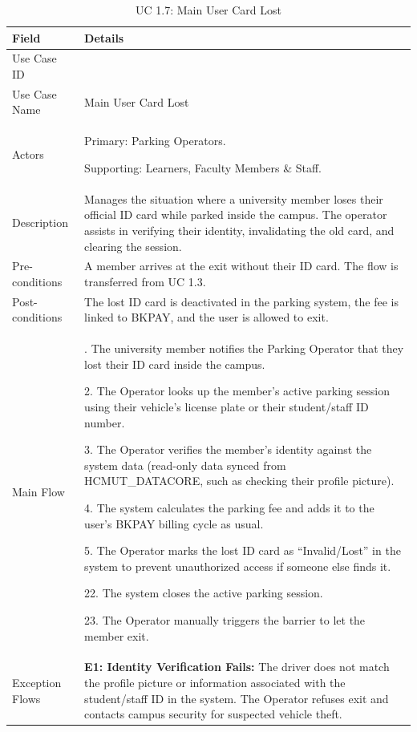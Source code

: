 \begin{table}[H]
\small
\renewcommand{\arraystretch}{1.4}
\begin{tabularx}{\textwidth}{|>{\raggedright\arraybackslash}p{3.5cm}|>{\RaggedRight\arraybackslash}X|}
\hline
\rowcolor{gray!20} \textbf{Field} & \textbf{Details} \\
\hline
Use Case ID & 1.7 \\
\hline
Use Case Name & Main User Card Lost \\
\hline
Actors & Primary: Parking Operators. \par Supporting: Learners, Faculty Members \& Staff. \\
\hline
Description & Manages the situation where a university member loses their official ID card while parked inside the campus. The operator assists in verifying their identity, invalidating the old card, and clearing the session. \\
\hline
Pre-conditions & A member arrives at the exit without their ID card. The flow is transferred from UC 1.3. \\
\hline
Post-conditions & The lost ID card is deactivated in the parking system, the fee is linked to BKPAY, and the user is allowed to exit. \\
\hline
Main Flow & 
1. The university member notifies the Parking Operator that they lost their ID card inside the campus. \par
2. The Operator looks up the member's active parking session using their vehicle's license plate or their student/staff ID number. \par
3. The Operator verifies the member's identity against the system data (read-only data synced from HCMUT\_DATACORE, such as checking their profile picture). \par
4. The system calculates the parking fee and adds it to the user's BKPAY billing cycle as usual. \par
5. The Operator marks the lost ID card as ``Invalid/Lost'' in the system to prevent unauthorized access if someone else finds it. \par
22. The system closes the active parking session. \par
23. The Operator manually triggers the barrier to let the member exit. \\
\hline
Exception Flows & 
\textbf{E1: Identity Verification Fails:} The driver does not match the profile picture or information associated with the student/staff ID in the system. The Operator refuses exit and contacts campus security for suspected vehicle theft. \\
\hline
\end{tabularx}
\caption{UC 1.7: Main User Card Lost}
\label{tab:uc1.7}
\end{table}